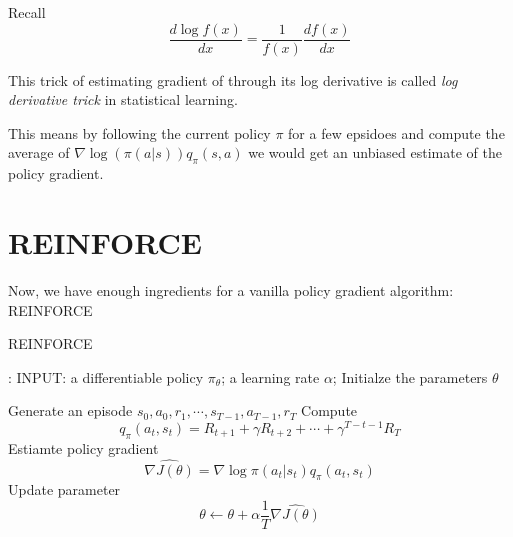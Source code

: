 \documentclass{article}
\begin{document}
Recall 
\[
  \frac{d \log f(x)}{dx} = \frac{1}{f(x)} \frac{d f(x)}{dx}
\]

This trick of estimating gradient of through its log derivative is called 
\emph{log derivative trick} in statistical learning. 

This means by following the current policy $\pi$ for a few epsidoes and compute
the average of $\nabla \log(\pi(a|s))q_{\pi}(s,a)$ we would get an unbiased 
estimate of the policy gradient. 

\section{REINFORCE}
Now, we have enough ingredients for a vanilla policy gradient algorithm: REINFORCE

\begin{algorithm}[H]
  \caption{REINFORCE}
\end{algorithm}
\begin{algorithmic}[1]
  \STATE: INPUT: a differentiable policy $\pi_{\theta}$;
  a learning rate $\alpha$; 
  \STATE Initialze the parameters $\theta$
  
  \REPEAT
    \STATE Generate an episode $s_0, a_0, r_1, \cdots, s_{T-1}, a_{T-1}, r_T$
    \STATE Compute 
    \[
      q_{\pi}(a_t, s_t)  = R_{t+1}+\gamma R_{t+2} + \cdots + 
        \gamma^{T-t-1}R_T
    \]
    \STATE Estiamte policy gradient
    \[
      \hat {\nabla J(\theta)} = \nabla \log \pi(a_t|s_t)q_{\pi}(a_t, s_t)
    \]
    \STATE Update parameter
    \[
      \theta \leftarrow \theta + \alpha\frac{1}{T}\hat{\nabla J(\theta)}
    \]
    \ENDFOR
\end{algorithmic}

      

    
\end{document}
